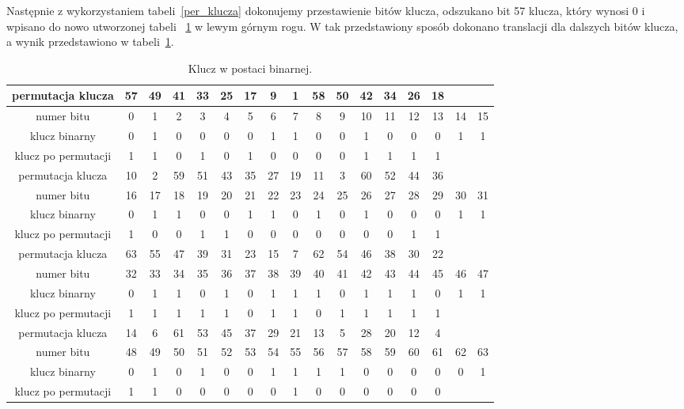 \documentclass[12p]{article}
\begin{document}
Następnie z wykorzystaniem tabeli~\ref{per_klucza} dokonujemy przestawienie bitów klucza, odszukano bit 57 klucza, który wynosi 0 i wpisano do nowo utworzonej tabeli ~\ref{tabela_podstawienia} w lewym górnym rogu. W tak przedstawiony sposób dokonano translacji dla dalszych bitów klucza, a wynik przedstawiono w tabeli~\ref{tabela_podstawienia}.

\begin{table}[H]
\centering
\begin{tabular}{|c|c|c|c|c|c|c|c|c|c|c|c|c|c|c|c|c|}
\hline
permutacja klucza & 57 & 49 & 41 & 33 & 25 & 17 & 9 & 1 & 58 & 50 & 42 & 34 & 26 & 18 & &\\
\hline
numer bitu & 0 & 1 & 2 & 3 & 4 & 5 & 6 & 7 & 8 & 9 & 10 & 11 & 12 & 13 & 14 & 15\\
\hline
klucz binarny & 0 & 1 & 0 & 0 & 0 & 0 & 1 & 1 & 0 & 0 & 1 & 0 & 0 & 0 & 1 & 1\\
\hline
klucz po permutacji & 1 & 1 & 0 & 1 & 0 & 1 & 0 & 0 & 0 & 0 & 1 & 1 & 1 & 1 &&\\

\hline
\hline
permutacja klucza & 10 & 2 & 59 & 51 & 43 & 35 & 27 & 19 & 11 & 3 & 60 & 52 & 44 & 36 &&\\
\hline
numer bitu & 16 & 17 & 18 & 19 & 20 & 21 & 22 & 23 & 24 & 25 & 26 & 27 & 28 & 29 & 30 & 31\\
\hline
klucz binarny & 0 & 1 & 1 & 0 & 0 & 1 & 1 & 0 & 1 & 0 & 1 & 0 & 0 & 0 & 1 & 1\\
\hline 
klucz po permutacji & 1 & 0 & 0 & 1 & 1 & 0 & 0 & 0 & 0 & 0 & 0 & 0 & 1 & 1 &&\\

\hline
\hline
permutacja klucza & 63 & 55 & 47 & 39 & 31 & 23 & 15 & 7 & 62 & 54 & 46 & 38 & 30 & 22 &&\\
\hline
numer bitu & 32 & 33 & 34 & 35 & 36 & 37 & 38 & 39 & 40 & 41 & 42 & 43 & 44 & 45 & 46 & 47 \\
\hline
klucz binarny & 0 & 1 & 1 & 0 & 1 & 0 & 1 & 1 & 1 & 0 & 1 & 1 & 1 & 0 & 1 & 1 \\
\hline
klucz po permutacji & 1 & 1 & 1 & 1 & 1 & 0 & 1 & 1 & 0 & 1 & 1 & 1 & 1 & 1 &&\\

\hline
\hline
permutacja klucza & 14 & 6 & 61 & 53 & 45 & 37 & 29 & 21 & 13 & 5 & 28 & 20 & 12 & 4 &&\\
\hline
numer bitu & 48 & 49 & 50 & 51 & 52 & 53 & 54 & 55 & 56 & 57 & 58 & 59 & 60 & 61 & 62 & 63\\
\hline
klucz binarny & 0 & 1 & 0 & 1 & 0 & 0 & 1 & 1 & 1 & 1 & 0 & 0 & 0 & 0 & 0 & 1\\
\hline 
klucz po permutacji & 1 & 1 & 0 & 0 & 0 & 0 & 0 & 1 & 0 & 0 & 0 & 0 & 0 & 0 &&\\
\hline
\end{tabular}
\caption{Klucz w postaci binarnej.}~\label{tabela_podstawienia}
\end{table}
\end{document}
